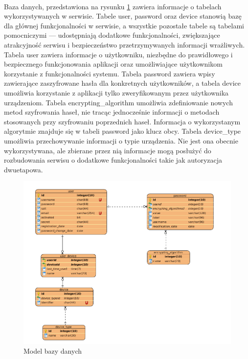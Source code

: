 \documentclass{article}
\begin{document}
    \paragraph{}Baza danych, przedstawiona na rysunku \ref{fig:db} zawiera informacje o tabelach wykorzystywanych w serwisie. Tabele user, password oraz device stanowią bazę dla głównej funkcjonalności w serwisie, a wszystkie pozostałe tabele są tabelami pomocniczymi --- udostępniają dodatkowe funkcjonalności, zwiększające atrakcyjność serwisu i bezpieczeństwo przetrzymywanych informacji wrażliwych. Tabela user zawiera informacje o użytkowniku, niezbędne do prawidłowego i bezpiecznego funkcjonowania aplikacji oraz umożliwiające użytkownikom korzystanie z funkcjonalności systemu. Tabela password zawiera wpisy zawierające zaszyfrowane hasła dla konkretnych użytkowników, a tabela device umożliwia korzystanie z aplikacji tylko zweryfikowanym przez użytkownika urządzeniom. Tabela encrypting\_algorithm umożliwia zdefiniowanie nowych metod szyfrowania haseł, nie tracąc jednocześnie informacji o metodach stosowanych przy szyfrowaniu poprzednich haseł. Informacja o wykorzystanym algorytmie znajduje się w tabeli password jako klucz obcy. Tabela device\_type umożliwia przechowywanie informacji o typie urządzenia. Nie jest ona obecnie wykorzystywana, ale zbierane przez nią informacje mogą posłużyć do rozbudowania serwisu o dodatkowe funkcjonalności takie jak autoryzacja dwuetapowa.

    \begin{figure}[H]
		\centering
		\includegraphics[width=1\linewidth]{assets/db.png}
		\caption{Model bazy danych}
		\label{fig:db}
	\end{figure}
\end{document}
